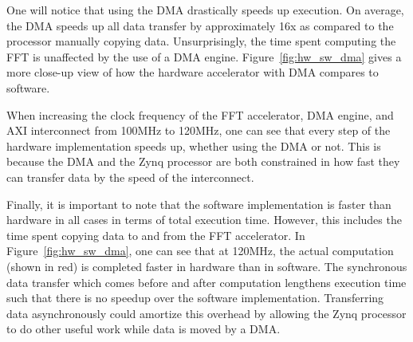 One will notice that using the DMA drastically speeds up execution. On average, the DMA speeds up all data transfer by approximately 16x as compared to the processor manually copying data. Unsurprisingly, the time spent computing the FFT is unaffected by the use of a DMA engine. Figure~\ref{fig:hw_sw_dma} gives a more close-up view of how the hardware accelerator with DMA compares to software.

When increasing the clock frequency of the FFT accelerator, DMA engine, and AXI interconnect from 100MHz to 120MHz, one can see that every step of the hardware implementation speeds up, whether using the DMA or not. This is because the DMA and the Zynq processor are both constrained in how fast they can transfer data by the speed of the interconnect.

Finally, it is important to note that the software implementation is faster than hardware in all cases in terms of total execution time. However, this includes the time spent copying data to and from the FFT accelerator. In Figure~\ref{fig:hw_sw_dma}, one can see that at 120MHz, the actual computation (shown in red) is completed faster in hardware than in software. The synchronous data transfer which comes before and after computation lengthens execution time such that there is no speedup over the software implementation. Transferring data asynchronously could amortize this overhead by allowing the Zynq processor to do other useful work while data is moved by a DMA.


